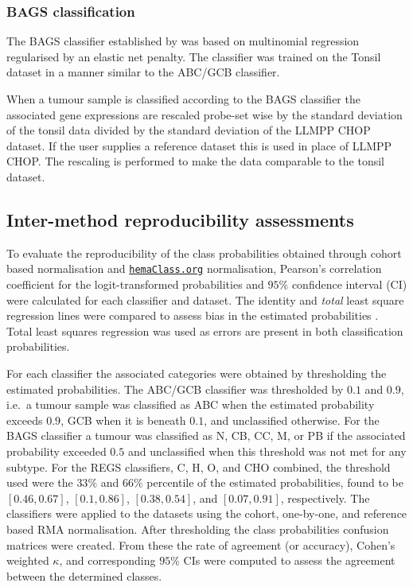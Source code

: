 \documentclass{bmcart}
\newcommand{\hemaClass}{\href{http://hemaClass.org}{\texttt{hemaClass.org}}}
\begin{document}
\subsubsection{BAGS classification}
The BAGS classifier established by \citet{DybkaerBoegsted2015} was based on multinomial regression regularised by an elastic net penalty.
The classifier was trained on the Tonsil dataset in a manner similar to the ABC/GCB classifier.

When a tumour sample is classified according to the BAGS classifier the associated gene expressions are rescaled probe-set wise by the standard deviation of the tonsil data divided by the standard deviation of the LLMPP CHOP dataset.
If the user supplies a reference dataset this is used in place of LLMPP CHOP.
The rescaling is performed to make the data comparable to the tonsil dataset.



\subsection{Inter-method reproducibility assessments}
To evaluate the reproducibility of the class probabilities obtained through cohort based normalisation and \hemaClass{} normalisation, Pearson's correlation coefficient for the logit-transformed probabilities and $95\%$ confidence interval (CI) were calculated for each classifier and dataset.
The identity and \emph{total} least square regression lines were compared to assess bias in the estimated probabilities \citep{CHEN1989}.
Total least squares regression was used as errors are present in both classification probabilities.

For each classifier the associated categories were obtained by thresholding the estimated probabilities.
The ABC/GCB classifier was thresholded by $0.1$ and $0.9$, i.e.\ a tumour sample was classified as ABC when the estimated probability exceeds $0.9$, GCB when it is beneath $0.1$, and unclassified otherwise.
For the BAGS classifier a tumour was classified as N, CB, CC, M, or PB if the associated probability exceeded $0.5$ and unclassified when this threshold was not met for any subtype.
For the REGS classifiers, C, H, O, and CHO combined, the threshold used were the $33\%$ and $66\%$ percentile of the estimated probabilities, found to be $[0.46, 0.67]$, $[0.1, 0.86]$, $[0.38, 0.54]$, and $[0.07, 0.91]$, respectively.
The classifiers were applied to the datasets using the cohort, one-by-one, and reference based RMA normalisation.
After thresholding the class probabilities confusion matrices were created.
From these the rate of agreement (or accuracy), Cohen's weighted $\kappa$, and corresponding $95\%$ CIs were computed to assess the agreement between the determined classes.
\end{document}
